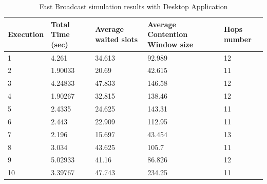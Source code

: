 \begin{table}
\caption{Fast Broadcast simulation results with Desktop Application}
\label{tab:Desktop_res}
\centering
\begin{tabular}{|m{}|m{}|m{}|m{}|m{}|}
\hline
Execution & Total \newline Time (sec) & Average waited slots & Average Contention Window size & Hops \newline number \\
\hline
1 & 4.261	& 34.613	& 92.989 	& 12 \\
\hline
2 & 1.90033	& 20.69  	& 42.615	& 11 \\
\hline
3 & 4.24833 	& 47.833	& 146.58 	& 12 \\
\hline
4 & 1.90267 	& 32.815  	& 138.46	& 12 \\ 
\hline
5 & 2.4335	& 24.625 	& 143.31	& 11 \\
\hline
6 & 2.443	& 22.909 	& 112.95	& 11 \\ 
\hline
7 & 2.196	& 15.697	& 43.454	& 13 \\
\hline
8 & 3.034	& 43.625	& 105.7 	& 11 \\
\hline
9 & 5.02933	& 41.16 	& 86.826	& 12 \\
\hline
10 & 3.39767	& 47.743 	& 234.25	& 11 \\
\hline
\end{tabular}
\end{table}  
